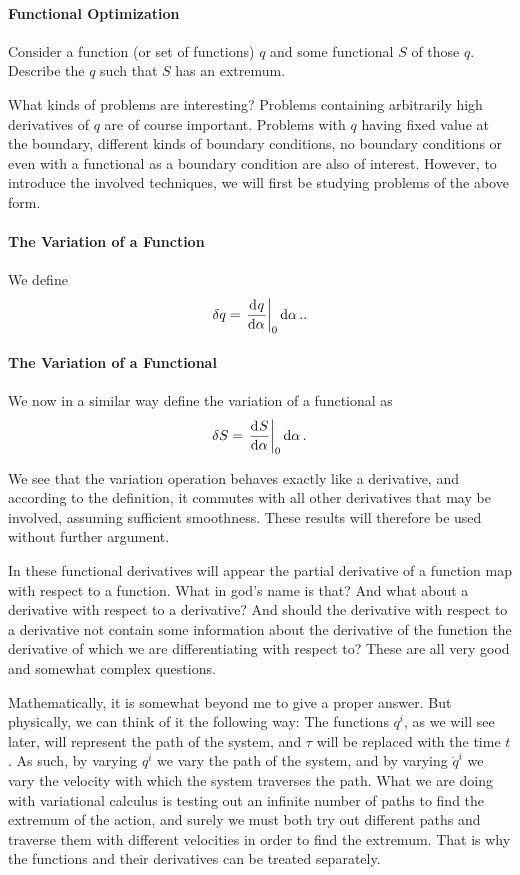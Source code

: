 \paragraph{Functional Optimization}
Consider a function (or set of functions) $q$ and some functional $S$ of those $q$. Describe the $q$ such that $S$ has an extremum.

What kinds of problems are interesting? Problems containing arbitrarily high derivatives of $q$ are of course important. Problems with $q$ having fixed value at the boundary, different kinds of boundary conditions, no boundary conditions or even with a functional as a boundary condition are also of interest. However, to introduce the involved techniques, we will first be studying problems of the above form.

\paragraph{The Variation of a Function}
We define
\begin{align*}
	\var{q} = \deval{q}{\alpha}{0}\dd{\alpha}..
\end{align*}

\paragraph{The Variation of a Functional}
We now in a similar way define the variation of a functional as
\begin{align*}
	\var{S} = \deval{S}{\alpha}{0}\dd{\alpha}.
\end{align*}

We see that the variation operation behaves exactly like a derivative, and according to the definition, it commutes with all other derivatives that may be involved, assuming sufficient smoothness. These results will therefore be used without further argument.

In these functional derivatives will appear the partial derivative of a function map with respect to a function. What in god's name is that? And what about a derivative with respect to a derivative? And should the derivative with respect to a derivative not contain some information about the derivative of the function the derivative of which we are differentiating with respect to? These are all very good and somewhat complex questions.

Mathematically, it is somewhat beyond me to give a proper answer. But physically, we can think of it the following way: The functions $q^{i}$, as we will see later, will represent the path of the system, and $\tau$ will be replaced with the time $t$. As such, by varying $q^{i}$ we vary the path of the system, and by varying $\dot{q}^{i}$ we vary the velocity with which the system traverses the path. What we are doing with variational calculus is testing out an infinite number of paths to find the extremum of the action, and surely we must both try out different paths and traverse them with different velocities in order to find the extremum. That is why the functions and their derivatives can be treated separately.

